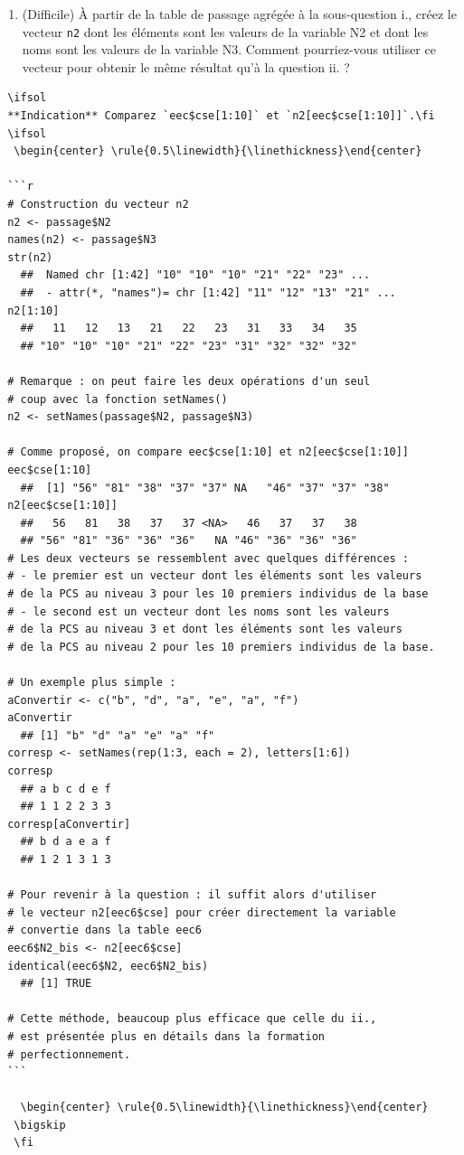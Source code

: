 \documentclass[12pt,twosided, notitlepage]{book}
\newif \ifsol
\begin{document}
\begin{enumerate}
\begin{enumerate}
    \begin{center} \rule{0.5\linewidth}{\linethickness}\end{center} 
     \bigskip 
     \fi
  \item
    (Difficile) À partir de la table de passage agrégée à la
    sous-question i., créez le vecteur \texttt{n2} dont les éléments
    sont les valeurs de la variable N2 et dont les noms sont les valeurs
    de la variable N3. Comment pourriez-vous utiliser ce vecteur pour
    obtenir le même résultat qu'à la question ii.
    ?
  \end{enumerate}

\begin{verbatim}
 \ifsol 
 **Indication** Comparez `eec$cse[1:10]` et `n2[eec$cse[1:10]]`.\fi 
 \ifsol 
  \begin{center} \rule{0.5\linewidth}{\linethickness}\end{center} 

 ```r
 # Construction du vecteur n2
 n2 <- passage$N2
 names(n2) <- passage$N3
 str(n2)
   ##  Named chr [1:42] "10" "10" "10" "21" "22" "23" ...
   ##  - attr(*, "names")= chr [1:42] "11" "12" "13" "21" ...
 n2[1:10]
   ##   11   12   13   21   22   23   31   33   34   35 
   ## "10" "10" "10" "21" "22" "23" "31" "32" "32" "32"

 # Remarque : on peut faire les deux opérations d'un seul 
 # coup avec la fonction setNames()
 n2 <- setNames(passage$N2, passage$N3)

 # Comme proposé, on compare eec$cse[1:10] et n2[eec$cse[1:10]]
 eec$cse[1:10]
   ##  [1] "56" "81" "38" "37" "37" NA   "46" "37" "37" "38"
 n2[eec$cse[1:10]]
   ##   56   81   38   37   37 <NA>   46   37   37   38 
   ## "56" "81" "36" "36" "36"   NA "46" "36" "36" "36"
 # Les deux vecteurs se ressemblent avec quelques différences : 
 # - le premier est un vecteur dont les éléments sont les valeurs
 # de la PCS au niveau 3 pour les 10 premiers individus de la base
 # - le second est un vecteur dont les noms sont les valeurs 
 # de la PCS au niveau 3 et dont les éléments sont les valeurs 
 # de la PCS au niveau 2 pour les 10 premiers individus de la base.

 # Un exemple plus simple : 
 aConvertir <- c("b", "d", "a", "e", "a", "f")
 aConvertir
   ## [1] "b" "d" "a" "e" "a" "f"
 corresp <- setNames(rep(1:3, each = 2), letters[1:6])
 corresp
   ## a b c d e f 
   ## 1 1 2 2 3 3
 corresp[aConvertir]
   ## b d a e a f 
   ## 1 2 1 3 1 3

 # Pour revenir à la question : il suffit alors d'utiliser
 # le vecteur n2[eec6$cse] pour créer directement la variable
 # convertie dans la table eec6
 eec6$N2_bis <- n2[eec6$cse]
 identical(eec6$N2, eec6$N2_bis)
   ## [1] TRUE

 # Cette méthode, beaucoup plus efficace que celle du ii., 
 # est présentée plus en détails dans la formation 
 # perfectionnement.
 ```

   \begin{center} \rule{0.5\linewidth}{\linethickness}\end{center} 
  \bigskip 
  \fi 
\end{verbatim}
\end{enumerate}
\end{document}
